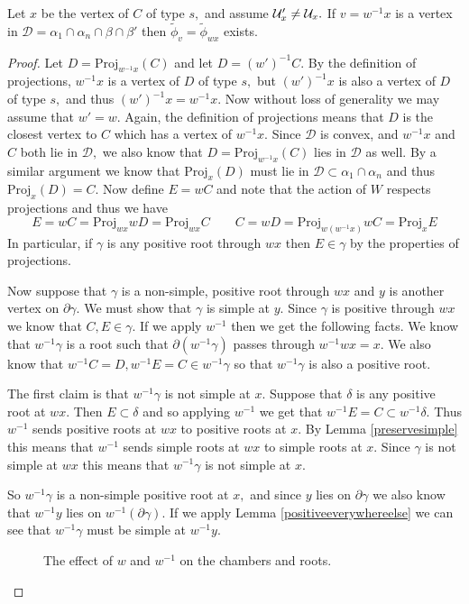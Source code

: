 \documentclass[class=book, crop=false,12 pt]{standalone}
\begin{document}
\begin{lemma}
	\label{Dexists}
	Let $x$ be the vertex of $C$ of type $s,$ and assume $\mathcal{U}'_x\neq \mathcal{U}_x.$ If $v=w^{-1}x$ is a vertex in $\mathcal{D}=\alpha_1\cap \alpha_n\cap \beta \cap \beta'$ then $\tilde{\phi}_v=\tilde{\phi}_{wx}$ exists.
\end{lemma}
\begin{proof}
	Let $D=\mathrm{Proj}_{w^{-1}x}(C)$ and let $D=(w')^{-1}C.$ By the definition of projections, $w^{-1}x$ is a vertex of $D$ of type $s,$ but $(w')^{-1}x$ is also a vertex of $D$ of type $s,$ and thus $(w')^{-1}x=w^{-1}x.$ Now without loss of generality we may assume that $w'=w.$ Again, the definition of projections means that $D$ is the closest vertex to $C$ which has a vertex of $w^{-1}x.$ Since $\mathcal{D}$ is convex, and $w^{-1}x$ and $C$ both lie in $\mathcal{D},$ we also know that $D=\mathrm{Proj}_{w^{-1}x}(C)$ lies in $\mathcal{D}$ as well. By a similar argument we know that $\mathrm{Proj}_{x}(D)$ must lie in $\mathcal{D}\subset \alpha_1\cap \alpha_n$ and thus $\mathrm{Proj}_{x}(D)=C.$ Now define $E=wC$ and note that the action of $W$ respects projections and thus we have
	\[
		E=wC=\mathrm{Proj}_{wx}{wD}=\mathrm{Proj}_{wx}{C} \qquad C=wD=\mathrm{Proj}_{w(w^{-1}x)}{wC}=\mathrm{Proj}_{x}{E}
	\]
In particular, if $\gamma$ is any positive root through $wx$ then $E\in \gamma$ by the properties of projections.



Now suppose that $\gamma$ is a non-simple, positive root through $wx$ and $y$ is another vertex on $\partial \gamma.$ We must show that $\gamma$ is simple at $y.$ Since $\gamma$ is positive through $wx$ we know that $C,E\in \gamma.$ If we apply $w^{-1}$ then we get the following facts. We know that $w^{-1}\gamma$ is a root such that $\partial (w^{-1}\gamma)$ passes through $w^{-1}wx=x.$ We also know that $w^{-1}C=D,w^{-1}E=C\in w^{-1}\gamma$ so that $w^{-1}\gamma$ is also a positive root.

The first claim is that $w^{-1}\gamma$ is not simple at $x.$ Suppose that $\delta$ is any positive root at $wx.$ Then $E\subset \delta$ and so applying $w^{-1}$ we get that $w^{-1}E=C\subset w^{-1}\delta.$ Thus $w^{-1}$ sends positive roots at $wx$ to positive roots at $x.$ By Lemma \ref{preservesimple} this means that $w^{-1}$ sends simple roots at $wx$ to simple roots at $x.$ Since $\gamma$ is not simple at $wx$ this means that $w^{-1}\gamma$ is not simple at $x.$

So $w^{-1}\gamma$ is a non-simple positive root at $x,$ and since $y$ lies on $\partial \gamma$ we also know that $w^{-1}y$ lies on $w^{-1}(\partial \gamma).$ If we apply Lemma \ref{positiveeverywhereelse} we can see that $w^{-1}\gamma$ must be simple at $w^{-1}y.$ 
\begin{figure}[h]
	\label{mappicture}
\caption{The effect of $w$ and $w^{-1}$ on the chambers and roots.}
\end{figure}



\end{proof}
\end{document}
